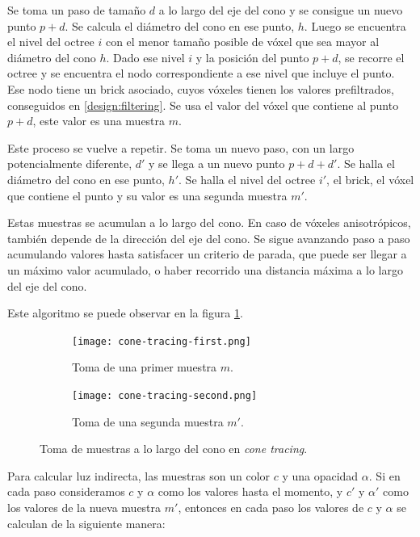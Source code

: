 Se toma un paso de tamaño $d$ a lo largo del eje del cono y se consigue un nuevo punto $p + d$.
Se calcula el diámetro del cono en ese punto, $h$.
Luego se encuentra el nivel del octree $i$ con el menor tamaño posible de vóxel que sea mayor al diámetro del cono $h$.
Dado ese nivel $i$ y la posición del punto $p + d$, se recorre el octree y se encuentra el nodo correspondiente a ese nivel que incluye el punto.
Ese nodo tiene un brick asociado, cuyos vóxeles tienen los valores prefiltrados, conseguidos en \ref{design:filtering}.
Se usa el valor del vóxel que contiene al punto $p + d$, este valor es una muestra $m$.

Este proceso se vuelve a repetir.
Se toma un nuevo paso, con un largo potencialmente diferente, $d'$ y se llega a un nuevo punto $p + d + d'$.
Se halla el diámetro del cono en ese punto, $h'$.
Se halla el nivel del octree $i'$, el brick, el vóxel que contiene el punto y su valor es una segunda muestra $m'$.

Estas muestras se acumulan a lo largo del cono.
En caso de vóxeles anisotrópicos, también depende de la dirección del eje del cono.
Se sigue avanzando paso a paso acumulando valores hasta satisfacer un criterio de parada,
que puede ser llegar a un máximo valor acumulado, o haber recorrido una distancia máxima a lo largo del eje del cono.

Este algoritmo se puede observar en la figura \ref{fig:cone-tracing-sampling}.

\begin{figure}
    \begin{subfigure}{.49\textwidth}
        \centering
        \texttt{[image: cone-tracing-first.png]}
        \caption{Toma de una primer muestra $m$.}
    \end{subfigure}
    \begin{subfigure}{.49\textwidth}
        \centering
        \texttt{[image: cone-tracing-second.png]}
        \caption{Toma de una segunda muestra $m'$.}
    \end{subfigure}
    \caption{Toma de muestras a lo largo del cono en \textit{cone tracing}.}
    \label{fig:cone-tracing-sampling}
\end{figure}

Para calcular luz indirecta, las muestras son un color $c$ y una opacidad $\alpha$.
Si en cada paso consideramos $c$ y $\alpha$ como los valores hasta el momento, y $c'$ y $\alpha'$ como los valores de la nueva muestra $m'$, entonces en cada paso los valores de $c$ y $\alpha$ se calculan de la siguiente manera:

